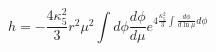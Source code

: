 \begin{equation} 
h=-\frac{4\kappa_5^2}{3}r^2 \mu^2 \int d\phi \frac{d\phi}{d\mu}
e^{4\frac{\kappa_5^2}{3}\int \frac{d\phi}{d\ln\mu}d\phi}
\end{equation}

